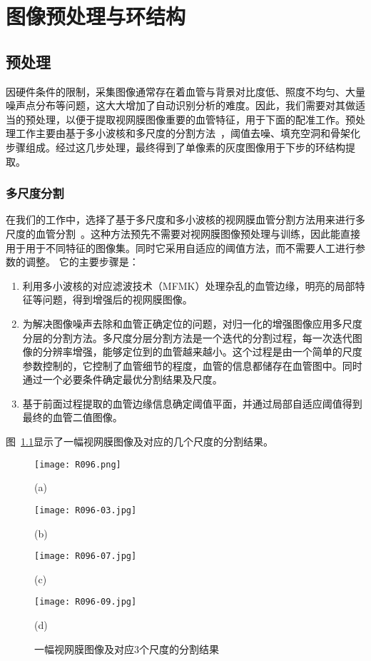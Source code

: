 

\chapter{图像预处理与环结构}
\label{cha2}

\section{预处理}
 因硬件条件的限制，采集图像通常存在着血管与背景对比度低、照度不均匀、大量噪声点分布等问题，这大大增加了自动识别分析的难度。因此，我们需要对其做适当的预处理，以便于提取视网膜图像重要的血管特征，用于下面的配准工作。预处理工作主要由基于多小波核和多尺度的分割方法~\cite{wang}，阈值去噪、填充空洞和骨架化步骤组成。经过这几步处理，最终得到了单像素的灰度图像用于下步的环结构提取。
\subsection{多尺度分割}
在我们的工作中，选择了基于多尺度和多小波核的视网膜血管分割方法用来进行多尺度的血管分割~\cite{wang}。这种方法预先不需要对视网膜图像预处理与训练，因此能直接用于用于不同特征的图像集。同时它采用自适应的阈值方法，而不需要人工进行参数的调整。
它的主要步骤是：
 \begin{enumerate}
\item 利用多小波核的对应滤波技术（MFMK）处理杂乱的血管边缘，明亮的局部特征等问题，得到增强后的视网膜图像。
\item 为解决图像噪声去除和血管正确定位的问题，对归一化的增强图像应用多尺度分层的分割方法。多尺度分层分割方法是一个迭代的分割过程，每一次迭代图像的分辨率增强，能够定位到的血管越来越小。这个过程是由一个简单的尺度参数控制的，它控制了血管细节的程度，血管的信息都储存在血管图中。同时通过一个必要条件确定最优分割结果及尺度。
\item 基于前面过程提取的血管边缘信息确定阈值平面，并通过局部自适应阈值得到最终的血管二值图像。
 \end{enumerate}
 
图~\ref{multiscale}显示了一幅视网膜图像及对应的几个尺度的分割结果。
 \begin{figure}
\centering
\begin{minipage}[b]{0.45\linewidth} 
      \centering 
      \texttt{[image: R096.png]}
        \centerline{(a) }\medskip
\end{minipage}
  \begin{minipage}[b]{0.45\linewidth}
    \centering
    \texttt{[image: R096-03.jpg]}
      \centerline{(b) }\medskip
  \end{minipage}
    \begin{minipage}[b]{0.45\linewidth}
    \centering
    \texttt{[image: R096-07.jpg]}
      \centerline{(c) }\medskip
  \end{minipage}
  \begin{minipage}[b]{0.45\linewidth}
    \centering
    \texttt{[image: R096-09.jpg]}
      \centerline{(d) }\medskip
  \end{minipage}
 \caption{一幅视网膜图像及对应3个尺度的分割结果}
\label{multiscale}
\end{figure}

